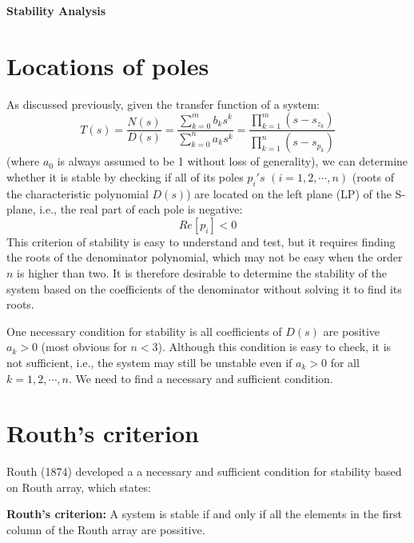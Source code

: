 \documentclass[12pt]{article}
\begin{document}
\begin{center}
{\LARGE \bf Stability Analysis}
\end{center}

\section*{Locations of poles}

As discussed previously, given the transfer function of a system:
\[
T(s)=\frac{N(s)}{D(s)}=\frac{\sum_{k=0}^m b_k s^k}{\sum_{k=0}^n a_k s^k}
=\frac{\prod_{k=1}^m (s-s_{z_k})}{\prod_{k=1}^n (s-s_{p_k})} 
\]
(where $a_0$ is always assumed to be 1 without loss of generality), we 
can determine whether it is stable by checking if all of its poles $p_i's$
$(i=1,2,\cdots,n)$ (roots of the characteristic polynomial $D(s)$) are 
located on the left plane (LP) of the S-plane, i.e., the real part of each
pole is negative:
\[ Re[p_i]<0 \]
This criterion of stability is easy to understand and test, but it requires
finding the roots of the denominator polynomial, which may not be easy when
the order $n$ is higher than two. It is therefore desirable to determine
the stability of the system based on the coefficients of the denominator
without solving it to find its roots. 

One necessary condition for stability is all coefficients of $D(s)$ are 
positive $a_k>0$ (most obvious for $n<3$). Although this condition is easy
to check, it is not sufficient, i.e., the system may still be unstable even 
if $a_k>0$ for all $k=1,2,\cdots,n$. We need to find a necessary and 
sufficient condition.

\section*{Routh's criterion}

Routh (1874) developed a a necessary and sufficient condition for stability
based on Routh array, which states:

{\bf Routh's criterion: } 
A system is stable if and only if all the elements in the first column of the
Routh array are possitive.
\end{document}

